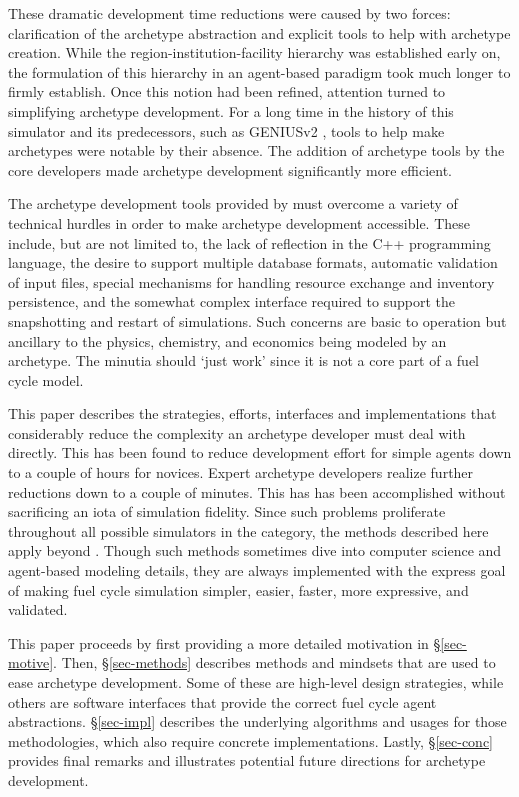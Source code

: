 These dramatic development time reductions were caused by two forces:
clarification of the archetype abstraction and explicit tools to help with 
archetype creation. While the region-institution-facility hierarchy was established 
early on, the formulation of this hierarchy in an agent-based paradigm took much 
longer to firmly establish.  Once this notion had been refined, attention turned to 
simplifying \Cyclus archetype development.
For a long time in the history of this simulator and its predecessors, such as 
\gls{GENIUSv2} , tools to help make archetypes were notable by their 
absence. 
The addition of archetype tools by the \cyclus core developers made archetype
development significantly more efficient.

The archetype development tools provided by \cyclus must overcome a variety of 
technical hurdles in order to make archetype development accessible.  These 
include, but are not limited to, the lack of reflection in the C++ programming language,
the desire to support multiple database formats, automatic validation of input files,
special mechanisms for handling resource exchange and inventory persistence, 
and the somewhat complex interface required to support the snapshotting and 
restart of simulations. Such concerns are basic to \cyclus operation but 
ancillary to the physics, chemistry, and economics being modeled by an archetype.
The minutia should `just work' since it is not a core part of a fuel cycle model.

This paper describes the strategies, efforts, interfaces
and implementations that considerably reduce the complexity  
an archetype developer must deal with directly. This has been 
found to reduce development effort for simple agents down to a couple 
of hours for novices. Expert archetype developers realize further 
reductions down to a couple of minutes. This has has been accomplished 
without sacrificing an iota of simulation fidelity. Since such 
problems proliferate throughout all possible simulators in 
the \cyclus category, the methods described here apply beyond \cyclus.
Though such methods sometimes dive into 
computer science and agent-based modeling details, they are always implemented
with the express goal of making fuel cycle simulation 
simpler, easier, faster, more expressive, and validated.

This paper proceeds by first providing a more detailed motivation 
in \S \ref{sec-motive}. Then, \S \ref{sec-methods} describes
methods and mindsets that are used to ease archetype development.
Some of these are high-level design strategies, while others are software 
interfaces that 
provide the correct fuel cycle agent abstractions. 
\S \ref{sec-impl} describes the underlying algorithms and usages
for those methodologies, which also require concrete implementations.
Lastly, \S \ref{sec-conc} provides final remarks and illustrates
potential future directions for \cyclus archetype development.
